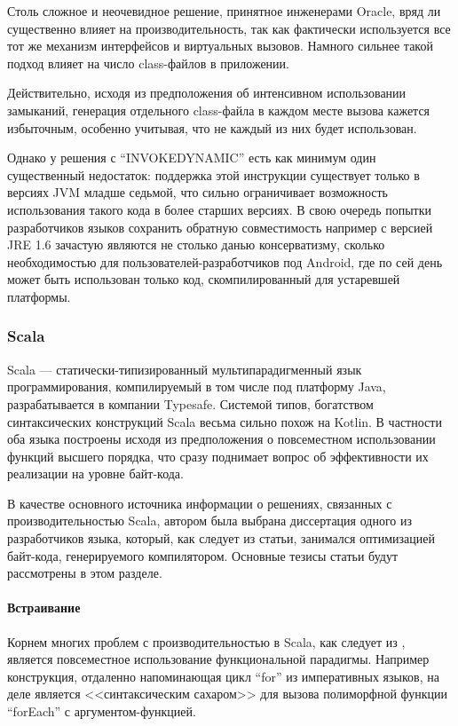 Столь сложное и неочевидное решение, принятное инженерами Oracle, вряд ли существенно влияет на
производительность, так как фактически используется все тот же механизм интерфейсов и виртуальных
вызовов.
Намного сильнее такой подход влияет на число class-файлов в приложении.

Действительно, исходя из предположения об интенсивном использовании замыканий, генерация отдельного
class-файла в каждом месте вызова кажется избыточным, особенно учитывая, что не каждый из них
будет использован.

Однако у решения с ``INVOKEDYNAMIC'' есть как минимум один существенный недостаток: поддержка этой
инструкции существует только в версиях JVM младше седьмой, что сильно ограничивает возможность
использования такого кода в более старших версиях. В свою очередь попытки разработчиков языков
сохранить обратную совместимость например с версией JRE 1.6 зачастую являются не столько данью
консерватизму, сколько необходимостью для пользователей-разработчиков под Android, где по сей день
может быть использован только код, скомпилированный для устаревшей платформы.

\subsubsection{Scala}
\label{section:scala}
Scala --- статически-типизированный мультипарадигменный язык программирования, компилируемый
в том числе под платформу Java, разрабатывается в компании Typesafe.
Системой типов, богатством синтаксических конструкций Scala весьма сильно похож на Kotlin.
В частности оба языка построены исходя из предположения о повсеместном использовании
функций высшего порядка, что сразу поднимает вопрос об эффективности их реализации на уровне
байт-кода.

В качестве основного источника информации о решениях, связанных с производительностью Scala,
автором была выбрана диссертация\cite{ScalaDragos} одного из разработчиков языка,
который, как следует из статьи, занимался оптимизацией байт-кода, генерируемого компилятором.
Основные тезисы статьи будут рассмотрены в этом разделе.

\paragraph{Встраивание}
Корнем многих проблем с производительностью в Scala, как следует из \cite{ScalaDragos}, является
повсеместное использование функциональной парадигмы.
Например конструкция, отдаленно напоминающая цикл ``for'' из императивных языков, на деле является
<<синтаксическим сахаром>> для вызова полиморфной функции ``forEach'' с аргументом-функцией.

